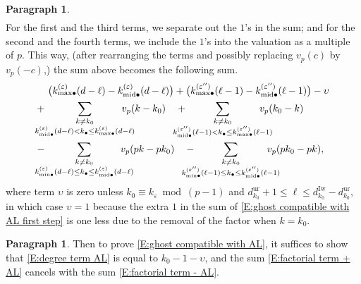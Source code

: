 \documentclass[12pt]{amsart}
\theoremstyle{definition}
\newtheorem{para}[subsection]{Paragraph}
\numberwithin{equation}{subsection}
\newcommand{\Iw}{\mathrm{Iw}}
\newcommand{\unr}{\mathrm{ur}}
\newcommand{\midd}{\mathrm{mid}}
\begin{document}
\begin{para}
\begin{align}
\end{align}
For the first and the third terms, we separate out the $1$'s in the sum; and for the second and the fourth terms, we include the $1$'s into the valuation as a multiple of $p$. This way, (after rearranging the terms and possibly replacing $v_p(c)$ by $v_p(-c)$,) the sum above becomes the following sum.
\begin{align}
\label{E:degree term AL}
&\big( k^{(\varepsilon)}_{{\max}\bullet}(d-\ell) - k^{(\varepsilon)}_{{\midd}\bullet}(d-\ell) \big)+ \big( k^{(\varepsilon'')}_{{\max}\bullet}(\ell-1) - k^{(\varepsilon'')}_{{\midd}\bullet}(\ell-1)\big) - \upsilon
\\
\label{E:factorial term + AL}
+\ & \hspace{-15pt}\sum_{\substack{k \neq k_0\\
k^{(\varepsilon)}_{\midd\bullet}(d-\ell) < k_\bullet \leq k^{(\varepsilon)}_{{\max}\bullet}(d-\ell)}}
\hspace{-15pt}v_p(k-k_0)\quad + \hspace{-15pt} \sum_{\substack{k \neq k_0\\
k^{(\varepsilon'')}_{{\midd}\bullet}(\ell-1) < k_\bullet \leq k^{(\varepsilon'')}_{{\max}\bullet}(\ell-1)}}
\hspace{-15pt}v_p(k_0-k)\quad 
\\
\label{E:factorial term - AL}
-\ & \hspace{-15pt} \sum_{\substack{k \neq k_0\\
k^{(\varepsilon)}_{{\min}\bullet}(d-\ell) \leq k_\bullet \leq k^{(\varepsilon)}_{{\midd}\bullet}(d-\ell)}}
\hspace{-15pt}v_p(pk-pk_0)\quad - \hspace{-15pt}\sum_{\substack{k \neq k_0\\
k^{(\varepsilon'')}_{{\min}\bullet}(\ell-1) \leq  k_\bullet \leq k^{(\varepsilon'')}_{{\midd}\bullet}(\ell-1)}}
\hspace{-15pt}v_p(pk_0-pk),
\end{align}
where term $\upsilon$ is zero unless $k_0 \equiv k_\varepsilon \bmod{(p-1)}$ and $d_{k_0}^\unr+1\leq  \ell\leq d_{k_0}^\Iw - d_{k_0}^\unr$,  in which case $\upsilon = 1$ because the extra $1$ in the sum of \eqref{E:ghost compatible with AL first step} is one less due to the removal of the factor when $k = k_0$.
\end{para}


\begin{para}
\label{P:para_137}
Then to prove \eqref{E:ghost compatible with AL}, it suffices to show that \eqref{E:degree term AL} is equal to $k_0-1-\upsilon$, and the sum \eqref{E:factorial term + AL} cancels with the sum \eqref{E:factorial term - AL}.
\end{para}
\end{document}
